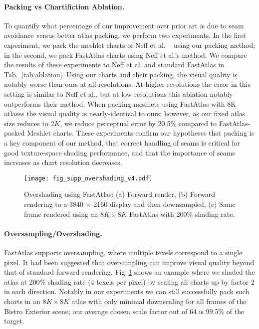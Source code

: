 

\paragraph*{Packing vs Chartifiction Ablation.} To quantify what percentage of our improvement over prior art is due to seam avoidance versus better atlas packing, we perform two experiments. In the first experiment, we pack the meshlet charts of Neff et al. ~\cite{Neff2022MSA} using our packing method; in the second, we pack FastAtlas charts using Neff et al.'s method. We compare the results of these experiments to Neff et al. and standard FastAtlas in Tab.~\ref{tab:ablation}. Using our charts and their packing, the visual quality is notably worse than ours at all resolutions. At higher resolutions the error in this setting is similar to Neff et al., but at low resolutions this ablation notably outperforms their method. When packing meshlets using FastAtlas with 8K atlases the visual quality is nearly-identical to ours; however, as our fixed atlas size reduces to $2K$, we reduce perceptual error by 20.5\% compared to FastAtlas-packed Meshlet charts. These experiments confirm our hypotheses that packing is a key component of our method, that correct handling of seams is critical for good texture-space shading performance, and that the importance of seams increases as chart resolution decreases.

\begin{figure}
\texttt{[image: fig\_supp\_overshading\_v4.pdf]}
\caption{Overshading using FastAtlas: (a) Forward render, (b) Forward rendering to a 3840 $\times$ 2160 display and then downsampled, (c) Same frame rendered using an $8K\times 8K$ FastAtlas with 200\% shading rate.}
\label{fig:overshading}
\end{figure}

\paragraph*{Oversampling/Overshading. }
FastAtlas supports oversampling, where multiple texels correspond to a single pixel. It had been suggested \cite{Baker2022} that oversampling can improve visual quality beyond that of standard forward rendering.  Fig~\ref{fig:overshading} shows an example where we shaded the atlas at 200\% shading rate (4 texels per pixel) by scaling all charts up by factor 2 in each direction. Notably in our experiments we can still successfully pack such charts in an $8K \times 8K$ atlas with only minimal downscaling for all frames of the Bistro Exterior scene; our average chosen scale factor out of 64 is 99.5\% of the target.

